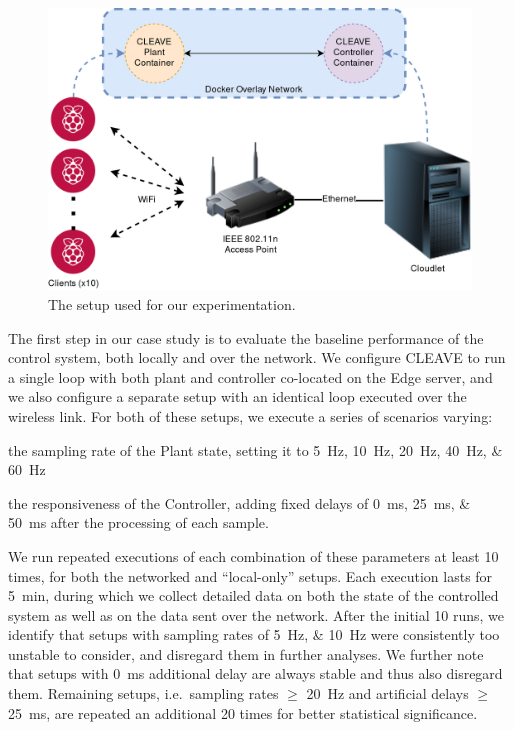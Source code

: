 \begin{figure}
    \centering
    \includegraphics[width=.95\columnwidth]{images/CLEAVE_experiment_setup}
    \caption{
        The setup used for our experimentation. 
    }\label{fig:cleave:expsetup}
\end{figure}

The first step in our case study is to evaluate the baseline performance of the control system, both locally and over the network.
We configure \ac{CLEAVE} to run a single loop with both plant and controller co-located on the Edge server, and we also configure a separate setup with an identical loop executed over the wireless link.
For both of these setups, we execute a series of scenarios varying:
\begin{enumerate*}[itemjoin={{; }}, itemjoin*={{; and }}]
    \item the sampling rate of the Plant state, setting it to \SIlist[list-final-separator={, or }]{5;10;20;40;60}{\hertz}
    \item the responsiveness of the Controller, adding fixed delays of \SIlist[list-final-separator={, or }]{0;25;50}{\milli\second} after the processing of each sample.
\end{enumerate*}

We run repeated executions of each combination of these parameters at least \num{10} times, for both the networked and ``local-only'' setups.
Each execution lasts for \SI{5}{\minute}, during which we collect detailed data on both the state of the controlled system as well as on the data sent over the network.
After the initial \num{10} runs, we identify that setups with sampling rates of \SIlist{5;10}{\hertz} were consistently too unstable to consider, and disregard them in further analyses.
We further note that setups with \SI{0}{\milli\second} additional delay are always stable and thus also disregard them.
Remaining setups, i.e.\ sampling rates \( \geq \) \SI{20}{\hertz} and artificial delays \( \geq \) \SI{25}{\milli\second}, are repeated an additional \num{20} times for better statistical significance.

